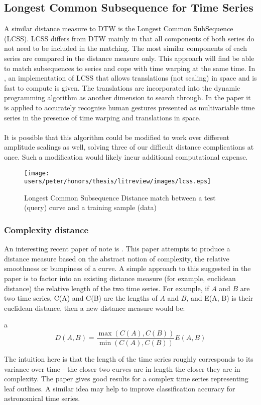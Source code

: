 	\subsection{Longest Common Subsequence for Time Series}
	A similar distance measure to DTW is the Longest Common SubSequence (LCSS). LCSS differs from DTW mainly in that all components of both series do not need to be included in the matching. The most similar components of each series are compared in the distance measure only. This approach will find be able to match subsequences to series and cope with time warping at the same time. In \citep{vlachos2002discovering}, an implementation of LCSS that allows translations (not scaling) in space and is fast to compute is given. The translations are incorporated into the dynamic programming algorithm as another dimension to search through.  In the paper it is applied to accurately recognise human gestures presented as multivariable time series in the presence of time warping and translations in space.
	\paragraph{}
	It is possible that this algorithm could be modified to work over different amplitude scalings as well, solving three of our difficult distance complications at once. Such a modification would likely incur additional computational expense. 
	
	\begin{figure}[h!]
	\centering
	\texttt{[image: users/peter/honors/thesis/litreview/images/lcss.eps]}
	\label{fig:lcss}
	\caption{Longest Common Subsequence Distance match between a test (query) curve and a training sample (data)}
	\end{figure}
	
	\subsubsection{Complexity distance} 
	An interesting recent paper of note is \citep{batista2011complexity}. This paper attempts to produce a distance measure based on the abstract notion of complexity, the relative smoothness or bumpiness of a curve. A simple approach to this suggested in the paper is to factor into an existing distance measure (for example, euclidean distance) the relative length of the two time series. For example, if $A$ and $B$ are two time series, C(A) and C(B) are the lengths of $A$ and $B$, and E(A, B) is their euclidean distance, then a new distance measure would be:
	\begin{center}a
	\begin{equation*}
		D(A,B) = \frac{\max(C(A), C(B))}{\min(C(A), C(B))}E(A,B)
	\end{equation*}
	\end{center}
	 The intuition here is that the length of the time series roughly corresponds to its variance over time - the closer two curves are in length the closer they are in complexity. The paper gives good results for a complex time series representing leaf outlines. A similar idea may help to improve classification accuracy for astronomical time series.
	
